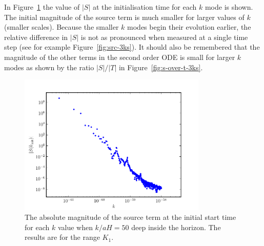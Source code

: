 In Figure~\ref{fig:src-kinit} the value of $|S|$ at the initialisation time
for each $k$ mode is shown. The initial magnitude of the source term is much
smaller for larger values of $k$ (smaller scales). 
Because the smaller $k$ modes begin their evolution earlier, the relative difference
in $|S|$ is not as pronounced when measured at a single time step (see for example
Figure~\ref{fig:src-3ks}).
It should also be remembered that the magnitude of the other terms in the second
order ODE is small for larger $k$ modes as shown by the ratio $|S|/|T|$ in
Figure~\ref{fig:s-over-t-3ks}.
% 
\begin{figure}[htbp]
\centering
\includegraphics[width=0.8\textwidth]{numerical/graphs/src_kinit_log}
 \caption[Source Term at Initialisation]{The absolute magnitude of the source 
term at the initial start time for each $k$ value when $k/aH = 50$ deep inside
the
horizon. The results are for the range $K_1$.}
\label{fig:src-kinit}
\end{figure}
% 

